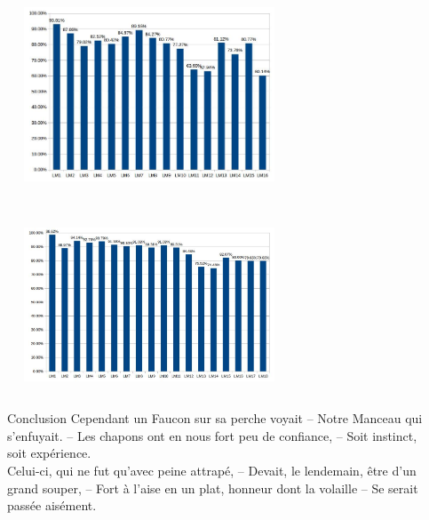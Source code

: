 \documentclass{LaBRI_poster}
\begin{document}
\begin{frame}[t]
\begin{columns}[t]
\begin{column}{\twocolwidth}
\begin{figure}
\includegraphics[width=0.7\textwidth]{images/mg_chartlms}
\end{figure}~\\[0.1cm]
\begin{figure}
\includegraphics[width=0.7\textwidth]{images/md_chartlms}
\end{figure}

\end{column}

\begin{column}{\sepwidth}\end{column}
\end{columns}



\begin{columns}[t] 

\begin{column}{\sepwidth}\end{column} %

\begin{column}{\onecolwidth}
\begin{block}{Conclusion}
Cependant un Faucon sur sa perche voyait -- 
Notre Manceau qui s’enfuyait. -- 
Les chapons ont en nous fort peu de confiance, --  
Soit instinct, soit expérience.\\
Celui-ci, qui ne fut qu’avec peine attrapé, -- 
Devait, le lendemain, être d’un grand souper, -- 
Fort à l’aise en un plat, honneur dont la volaille -- 
Se serait passée aisément.
\end{block}
\end{column}


\end{columns}
\end{frame}
\end{document}
